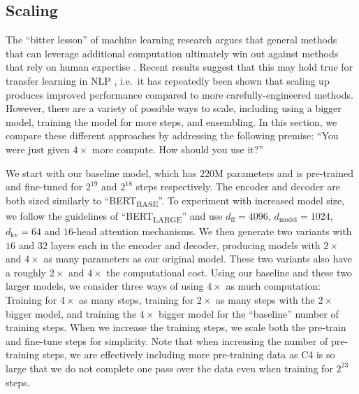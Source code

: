 \documentclass[twoside,11pt]{article}
\begin{document}
\subsection{Scaling}
\label{sec:scaling}

The ``bitter lesson'' of machine learning research argues that general methods that can leverage additional computation ultimately win out against methods that rely on human expertise \citep{sutton2019bitter,hestness2017deep,shazeer2017outrageously,jozefowicz2016exploring,mahajan2018exploring,shazeer2018mesh,shazeer2017outrageously,huang2018gpipe,keskar2019ctrl}.
Recent results suggest that this may hold true for transfer learning in NLP \citep{liu2019roberta,radford2019language,yang2019xlnet,lan2019albert}, i.e.\ it has repeatedly been shown that scaling up produces improved performance compared to more carefully-engineered methods.
However, there are a variety of possible ways to scale, including using a bigger model, training the model for more steps, and ensembling.
In this section, we compare these different approaches by addressing the following premise: ``You were just given $4\times$ more compute. How should you use it?''

We start with our baseline model, which has $220\mathrm{M}$ parameters and is pre-trained and fine-tuned for $2^{19}$ and $2^{18}$ steps respectively.
The encoder and decoder are both sized similarly to ``BERT\textsubscript{BASE}''.
To experiment with increased model size, we follow the guidelines of ``BERT\textsubscript{LARGE}'' \cite{devlin2018bert} and use $d_{\mathrm{ff}} = 4096$, $d_{\mathrm{model}} = 1024$, $d_{\mathrm{kv}} = 64$ and $16$-head attention mechanisms.
We then generate two variants with $16$ and $32$ layers each in the encoder and decoder, producing models with $2\times$ and $4\times$ as many parameters as our original model.
These two variants also have a roughly $2\times$ and $4\times$ the computational cost.
Using our baseline and these two larger models, we consider three ways of using $4\times$ as much computation: Training for $4\times$ as many steps, training for $2\times$ as many steps with the $2\times$ bigger model, and training the $4\times$ bigger model for the ``baseline'' number of training steps.
When we increase the training steps, we scale both the pre-train and fine-tune steps for simplicity.
Note that when increasing the number of pre-training steps, we are effectively including more pre-training data as C4 is so large that we do not complete one pass over the data even when training for $2^{23}$ steps.
\end{document}
